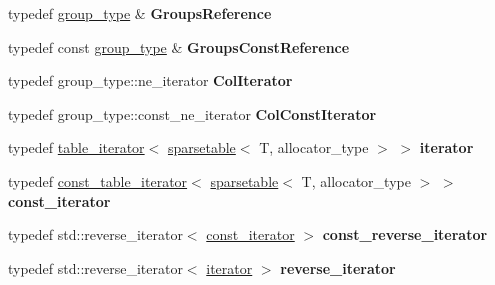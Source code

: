 \begin{DoxyCompactItemize}
\item 
typedef \hyperlink{classspp___1_1sparsegroup}{group\+\_\+type} \& {\bfseries Groups\+Reference}\hypertarget{classspp___1_1sparsetable_ac375852638174a039ac4f2f4afb7dafc}{}\label{classspp___1_1sparsetable_ac375852638174a039ac4f2f4afb7dafc}

\item 
typedef const \hyperlink{classspp___1_1sparsegroup}{group\+\_\+type} \& {\bfseries Groups\+Const\+Reference}\hypertarget{classspp___1_1sparsetable_a3c084de732fc5f06618831445c98d55e}{}\label{classspp___1_1sparsetable_a3c084de732fc5f06618831445c98d55e}

\item 
typedef group\+\_\+type\+::ne\+\_\+iterator {\bfseries Col\+Iterator}\hypertarget{classspp___1_1sparsetable_a8c3b63839f9eaa3a63c6f06ec4299872}{}\label{classspp___1_1sparsetable_a8c3b63839f9eaa3a63c6f06ec4299872}

\item 
typedef group\+\_\+type\+::const\+\_\+ne\+\_\+iterator {\bfseries Col\+Const\+Iterator}\hypertarget{classspp___1_1sparsetable_a64bc8266a4d28a7842ce16e689482199}{}\label{classspp___1_1sparsetable_a64bc8266a4d28a7842ce16e689482199}

\item 
typedef \hyperlink{classspp___1_1table__iterator}{table\+\_\+iterator}$<$ \hyperlink{classspp___1_1sparsetable}{sparsetable}$<$ T, allocator\+\_\+type $>$ $>$ {\bfseries iterator}\hypertarget{classspp___1_1sparsetable_a51b65f392368c5d5a7d27f6d2252805a}{}\label{classspp___1_1sparsetable_a51b65f392368c5d5a7d27f6d2252805a}

\item 
typedef \hyperlink{classspp___1_1const__table__iterator}{const\+\_\+table\+\_\+iterator}$<$ \hyperlink{classspp___1_1sparsetable}{sparsetable}$<$ T, allocator\+\_\+type $>$ $>$ {\bfseries const\+\_\+iterator}\hypertarget{classspp___1_1sparsetable_a995df79b5fcee135acc90e4a3e83dc81}{}\label{classspp___1_1sparsetable_a995df79b5fcee135acc90e4a3e83dc81}

\item 
typedef std\+::reverse\+\_\+iterator$<$ \hyperlink{classspp___1_1const__table__iterator}{const\+\_\+iterator} $>$ {\bfseries const\+\_\+reverse\+\_\+iterator}\hypertarget{classspp___1_1sparsetable_ae6bd3b4df4c247967d90337b70d97fd7}{}\label{classspp___1_1sparsetable_ae6bd3b4df4c247967d90337b70d97fd7}

\item 
typedef std\+::reverse\+\_\+iterator$<$ \hyperlink{classspp___1_1table__iterator}{iterator} $>$ {\bfseries reverse\+\_\+iterator}\hypertarget{classspp___1_1sparsetable_a8faf87e0aea6bd3b05b08d6d5d6aecf0}{}\label{classspp___1_1sparsetable_a8faf87e0aea6bd3b05b08d6d5d6aecf0}


\end{DoxyCompactItemize}
